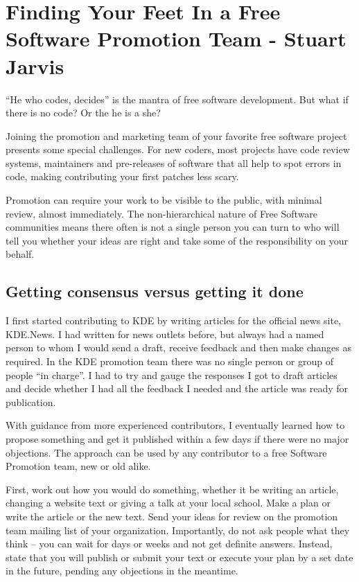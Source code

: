 \chapter{Finding Your Feet In a Free Software Promotion Team - Stuart Jarvis}
``He who codes, decides'' is the mantra of free software development. But what if there is no code? Or the he is a she?

Joining the promotion and marketing team of your favorite free software project presents some special challenges. For new coders, most projects have code review systems, maintainers and pre-releases of software that all help to spot errors in code, making contributing your first patches less scary. 

Promotion can require your work to be visible to the public, with minimal review, almost immediately. The non-hierarchical nature of Free Software communities means there often is not a single person you can turn to who will tell you whether your ideas are right and take some of the responsibility on your behalf.

\section*{Getting consensus versus getting it done}

I first started contributing to KDE by writing articles for the official news site, KDE.News. I had written for news outlets before, but always had a named person to whom I would send a draft, receive feedback and then make changes as required. In the KDE promotion team there was no single person or group of people ``in charge''. I had to try and gauge the responses I got to draft articles and decide whether I had all the feedback I needed and the article was ready for publication.

With guidance from more experienced contributors, I eventually learned how to propose something and get it published within a few days if there were no major objections. The approach can be used by any contributor to a free Software Promotion team, new or old alike.

First, work out how you would do something, whether it be writing an article, changing a website text or giving a talk at your local school. Make a plan or write the article or the new text. Send your ideas for review on the promotion team mailing list of your organization. Importantly, do not ask people what they think -- you can wait for days or weeks and not get definite answers. Instead, state that you will publish or submit your text or execute your plan by a set date in the future, pending any objections in the meantime.

